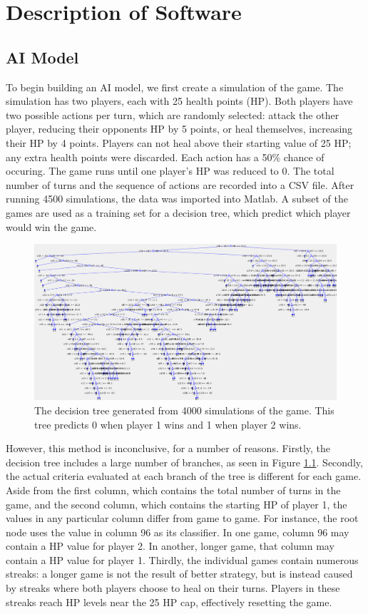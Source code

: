 \chapter{Description of Software}
\section{AI Model}
To begin building an AI model, we first create a simulation of the game. The simulation has two players, each with 25 health points (HP). Both players have two possible actions per turn, which are randomly selected: attack the other player, reducing their opponents HP by 5 points, or heal themselves, increasing their HP by 4 points. Players can not heal above their starting value of 25 HP; any extra health points were discarded. Each action has a 50\% chance of occuring. The game runs until one player's HP was reduced to 0. The total number of turns and the sequence of actions are recorded into a CSV file. After running 4500 simulations, the data was imported into Matlab. A subset of the games are used as a training set for a decision tree, which predict which player would win the game.\\

\begin{figure}[H]
  \centering
  \includegraphics[width=13cm]{figures/firstDecisionTree.png}
  \caption{The decision tree generated from 4000 simulations of the game. This tree predicts 0 when player 1 wins and 1 when player 2 wins.}
  \label{fig:decisionTree1}
\end{figure}

However, this method is inconclusive, for a number of reasons. Firstly, the decision tree includes a large number of branches, as seen in Figure \ref{fig:decisionTree1}. Secondly, the actual criteria evaluated at each branch of the tree is different for each game. Aside from the first column, which contains the total number of turns in the game, and the second column, which contains the starting HP of player 1, the values in any particular column differ from game to game. For instance, the root node uses the value in column 96 as its classifier. In one game, column 96 may contain a HP value for player 2. In another, longer game, that column may contain a HP value for player 1. Thirdly, the individual games contain numerous streaks: a longer game is not the result of better strategy, but is instead caused by streaks where both players choose to heal on their turns. Players in these streaks reach HP levels near the 25 HP cap, effectively resetting the game.

